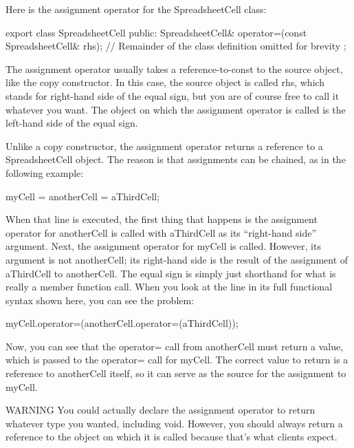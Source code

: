 
Here is the assignment operator for the SpreadsheetCell class:

\begin{cpp}
export class SpreadsheetCell
{
    public:
        SpreadsheetCell& operator=(const SpreadsheetCell& rhs);
        // Remainder of the class definition omitted for brevity
};
\end{cpp}

The assignment operator usually takes a reference-to-const to the source object, like the copy constructor. In this case, the source object is called rhs, which stands for right-hand side of the equal sign, but you are of course free to call it whatever you want. The object on which the assignment operator is called is the left-hand side of the equal sign.

Unlike a copy constructor, the assignment operator returns a reference to a SpreadsheetCell object. The reason is that assignments can be chained, as in the following example:

\begin{cpp}
myCell = anotherCell = aThirdCell;
\end{cpp}

When that line is executed, the first thing that happens is the assignment operator for anotherCell is called with aThirdCell as its “right-hand side” argument. Next, the assignment operator for myCell is called. However, its argument is not anotherCell; its right-hand side is the result of the assignment of aThirdCell to anotherCell. The equal sign is simply just shorthand for what is really a member function call. When you look at the line in its full functional syntax shown here, you can see the problem:

\begin{cpp}
myCell.operator=(anotherCell.operator=(aThirdCell));
\end{cpp}

Now, you can see that the operator= call from anotherCell must return a value, which is passed to the operator= call for myCell. The correct value to return is a reference to anotherCell itself, so it can serve as the source for the assignment to myCell.

\begin{myWarning}{WARNING}
You could actually declare the assignment operator to return whatever type you wanted, including void. However, you should always return a reference to the object on which it is called because that’s what clients expect.
\end{myWarning}

